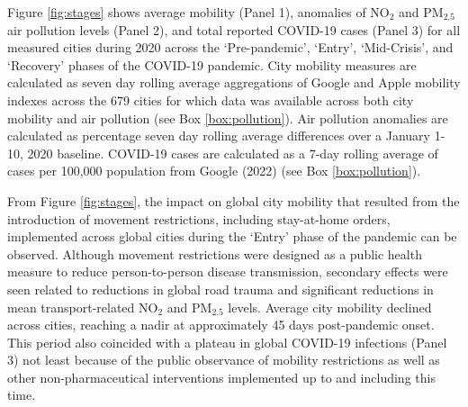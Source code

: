 \documentclass[preprint,10pt]{elsarticle} %
\begin{document}
Figure \ref{fig:stages} shows average mobility (Panel 1), anomalies of NO$_{2}$ and PM$_{2.5}$ air pollution levels (Panel 2), and total reported COVID-19 cases (Panel 3) for all measured cities during 2020 across the `Pre-pandemic', `Entry', `Mid-Crisis', and `Recovery' phases of the COVID-19 pandemic. City mobility measures are calculated as seven day rolling average aggregations of Google and Apple mobility indexes across the 679 cities for which data was available across both city mobility and air pollution (see Box \ref{box:pollution}). Air pollution anomalies are calculated as percentage seven day rolling average differences over a January 1-10, 2020 baseline. COVID-19 cases are calculated as a 7-day rolling average of cases per 100,000 population from Google (2022)\cite{Google2022} (see Box \ref{box:pollution}).

From Figure \ref{fig:stages}, the impact on global city mobility that resulted from the introduction of movement restrictions, including stay-at-home orders, implemented across global cities during the `Entry' phase\cite{hale2021global} of the pandemic can be observed. Although movement restrictions were designed as a public health measure to reduce person-to-person disease transmission, secondary effects were seen related to reductions in global road trauma \cite{ITFRS} and significant reductions in mean transport-related NO$_{2}$ and PM$_{2.5}$ levels\cite{zhang2023impact}. Average city mobility declined across cities, reaching a nadir at approximately 45 days post-pandemic onset. This period also coincided with a plateau in global COVID-19 infections (Panel 3) not least because of the public observance of mobility restrictions as well as other non-pharmaceutical interventions implemented up to and including this time\cite{hale2021global}. 
\end{document}
